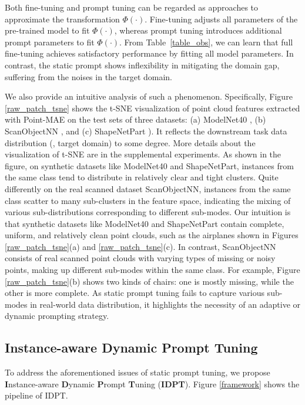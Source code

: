 \documentclass[10pt,twocolumn,letterpaper]{article}
\begin{document}
Both fine-tuning and prompt tuning can be regarded as approaches to approximate the transformation $\Phi(\cdot)$. Fine-tuning adjusts all parameters of the pre-trained model to fit $\Phi(\cdot)$, whereas prompt tuning introduces additional prompt parameters to fit $\Phi(\cdot)$. From Table~\ref{table_obs}, we can learn that full fine-tuning achieves satisfactory performance by fitting all model parameters. In contrast, the static prompt shows inflexibility in mitigating the domain gap, suffering from the noises in the target domain.

We also provide an intuitive analysis of such a phenomenon. 
Specifically, Figure \ref{raw_patch_tsne} shows the t-SNE \cite{van2008visualizing} visualization of point cloud features extracted with Point-MAE \cite{pang2022masked} on the test sets of three datasets: (a) ModelNet40 \cite{wu20153d}, (b) ScanObjectNN \cite{uy2019revisiting}, and (c) ShapeNetPart \cite{yi2016scalable}).
It reflects the downstream task data distribution (\ie, target domain) to some degree. More details about the visualization of t-SNE are in the supplemental experiments.
As shown in the figure, on synthetic datasets like ModelNet40 and ShapeNetPart, instances from the same class tend to distribute in relatively clear and tight clusters. 
Quite differently on the real scanned dataset ScanObjectNN, instances from the same class scatter to many sub-clusters in the feature space, indicating the mixing of various sub-distributions corresponding to different sub-modes. 
Our intuition is that synthetic datasets like ModelNet40 and ShapeNetPart contain complete, uniform, and relatively clean point clouds, such as the airplanes shown in Figures \ref{raw_patch_tsne}(a) and \ref{raw_patch_tsne}(c). 
In contrast, ScanObjectNN consists of real scanned point clouds with varying types of missing or noisy points, making up different sub-modes within the same class. 
For example, Figure \ref{raw_patch_tsne}(b) shows two kinds of chairs: one is mostly missing, while the other is more complete. 
As static prompt tuning fails to capture various sub-modes in real-world data distribution, it highlights the necessity of an adaptive or dynamic prompting strategy. 


\subsection{Instance-aware Dynamic Prompt Tuning}
\label{subsec:idpt}

To address the aforementioned issues of static prompt tuning, we propose \textbf{I}nstance-aware \textbf{D}ynamic \textbf{P}rompt \textbf{T}uning (\textbf{IDPT}). Figure \ref{framework} shows the pipeline of IDPT. 
\end{document}
